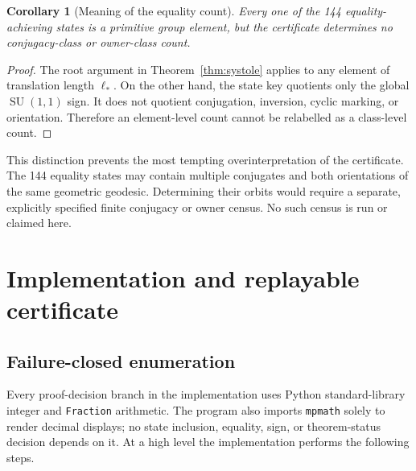 \documentclass[11pt,a4paper]{article}
\newtheorem{corollary}[theorem]{Corollary}
\theoremstyle{definition}
\newcommand{\SU}{\operatorname{SU}}
\newcommand{\length}{\ell}
\begin{document}
\begin{corollary}[Meaning of the equality count]
Every one of the 144 equality-achieving states is a primitive group element,
but the certificate determines no conjugacy-class or owner-class count.
\end{corollary}

\begin{proof}
The root argument in Theorem~\ref{thm:systole} applies to any element of
translation length \(\length_*\).  On the other hand, the state key quotients
only the global \(\SU(1,1)\) sign.  It does not quotient conjugation, inversion,
cyclic marking, or orientation.  Therefore an element-level count cannot be
relabelled as a class-level count.
\end{proof}

This distinction prevents the most tempting overinterpretation of the
certificate.  The 144 equality states may contain multiple conjugates and
both orientations of the same geometric geodesic.  Determining their orbits
would require a separate, explicitly specified finite conjugacy or owner
census.  No such census is run or claimed here.

\section{Implementation and replayable certificate}
\label{sec:implementation}

\subsection{Failure-closed enumeration}

Every proof-decision branch in the implementation uses Python
standard-library integer and \texttt{Fraction} arithmetic.  The program also
imports \texttt{mpmath} solely to render decimal displays; no state inclusion,
equality, sign, or theorem-status decision depends on it.  At a high level the
implementation performs the following steps.
\end{document}
